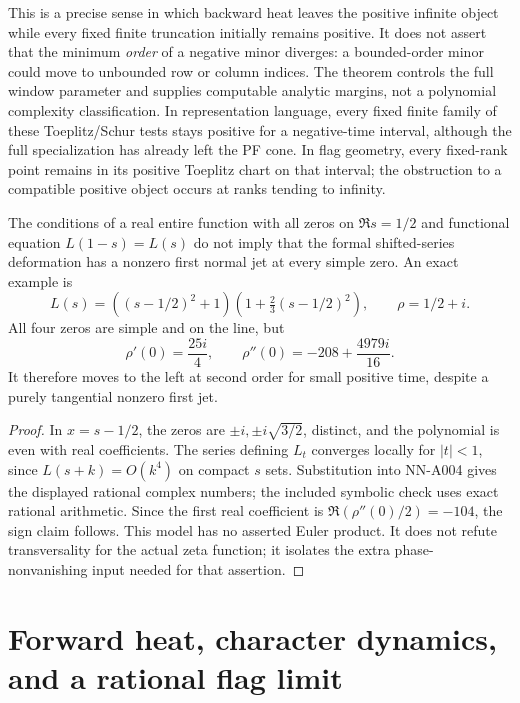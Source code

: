 This is a precise sense in which backward heat leaves the positive
infinite object while every fixed finite truncation initially remains
positive. It does not assert that the minimum \emph{order} of a negative
minor diverges: a bounded-order minor could move to unbounded row or
column indices. The theorem controls the full window parameter and
supplies computable analytic margins, not a polynomial complexity
classification. In representation language, every fixed finite family
of these Toeplitz/Schur tests stays positive for a negative-time interval,
although the full specialization has already left the PF cone. In flag
geometry, every fixed-rank point remains in its positive Toeplitz chart
on that interval; the obstruction to a compatible positive object
occurs at ranks tending to infinity.

\begin{proposition}
The conditions of a real entire function with all zeros on
$\Re s=1/2$ and functional equation $L(1-s)=L(s)$ do not imply that
the formal shifted-series deformation has a nonzero first normal jet
at every simple zero. An exact example is
\[
 L(s)=((s-1/2)^2+1)(1+\tfrac23(s-1/2)^2),\qquad \rho=1/2+i.
\]
All four zeros are simple and on the line, but
\[
 \rho'(0)=\frac{25i}{4},\qquad
 \rho''(0)=-208+\frac{4979i}{16}.
\]
It therefore moves to the left at second order for small positive
time, despite a purely tangential nonzero first jet.
\end{proposition}
\begin{proof}
In $x=s-1/2$, the zeros are $\pm i,\pm i\sqrt{3/2}$, distinct,
and the polynomial is even with real coefficients.
The series defining $L_t$ converges locally for $|t|<1$, since
$L(s+k)=O(k^4)$ on compact $s$ sets. Substitution into NN-A004 gives
the displayed rational complex numbers; the included symbolic check
uses exact rational arithmetic. Since the first real coefficient is
$\Re(\rho''(0)/2)=-104$, the sign claim follows.
This model has no asserted Euler product. It does not refute
transversality for the actual zeta function; it isolates the extra
phase-nonvanishing input needed for that assertion.
\end{proof}


\section{Forward heat, character dynamics, and a rational flag limit}

